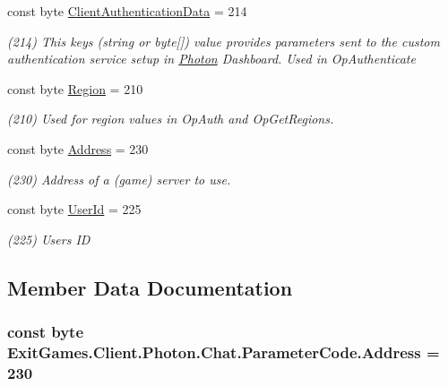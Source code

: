 \begin{DoxyCompactItemize}
const byte \hyperlink{class_exit_games_1_1_client_1_1_photon_1_1_chat_1_1_parameter_code_a188165801d2b627e28b1476353e103ad}{Client\+Authentication\+Data} = 214
\begin{DoxyCompactList}\small\item\em (214) This key\textquotesingle{}s (string or byte\mbox{[}\mbox{]}) value provides parameters sent to the custom authentication service setup in \hyperlink{namespace_exit_games_1_1_client_1_1_photon}{Photon} Dashboard. Used in Op\+Authenticate\end{DoxyCompactList}\item 
const byte \hyperlink{class_exit_games_1_1_client_1_1_photon_1_1_chat_1_1_parameter_code_a858cbc8aac0919b92ab761e92decf1da}{Region} = 210
\begin{DoxyCompactList}\small\item\em (210) Used for region values in Op\+Auth and Op\+Get\+Regions.\end{DoxyCompactList}\item 
const byte \hyperlink{class_exit_games_1_1_client_1_1_photon_1_1_chat_1_1_parameter_code_a7fa2bc4b15e962459df490987acb4745}{Address} = 230
\begin{DoxyCompactList}\small\item\em (230) Address of a (game) server to use.\end{DoxyCompactList}\item 
const byte \hyperlink{class_exit_games_1_1_client_1_1_photon_1_1_chat_1_1_parameter_code_a2b1f96b419566ad8b1bfc78caf261f76}{User\+Id} = 225
\begin{DoxyCompactList}\small\item\em (225) User\textquotesingle{}s ID\end{DoxyCompactList}\end{DoxyCompactItemize}


\subsection{Member Data Documentation}
\subsubsection[{\texorpdfstring{Address}{Address}}]{\setlength{\rightskip}{0pt plus 5cm}const byte Exit\+Games.\+Client.\+Photon.\+Chat.\+Parameter\+Code.\+Address = 230}\hypertarget{class_exit_games_1_1_client_1_1_photon_1_1_chat_1_1_parameter_code_a7fa2bc4b15e962459df490987acb4745}{}\label{class_exit_games_1_1_client_1_1_photon_1_1_chat_1_1_parameter_code_a7fa2bc4b15e962459df490987acb4745}


